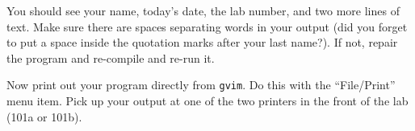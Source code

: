 You should see your name, today's date, the lab number, and two more lines of text. Make sure there are spaces
separating words in your output (did you forget to put a space inside the quotation marks after your last name?). If
not, repair the program and re-compile and re-run it.

%

Now print out your program directly from {\tt gvim}. Do this with the ``File/Print'' menu item. Pick up your output at
one of the two printers in the front of the lab (101a or 101b).




